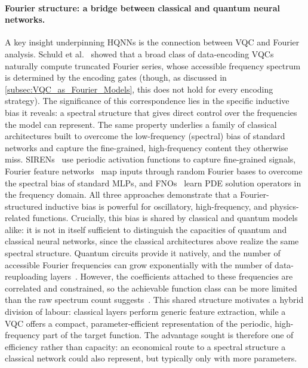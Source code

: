 \documentclass[aps,10pt,groupedaddress,prx,superscriptaddress,twocolumn,balancelastpage, tightenlines]{revtex4-2}
\theoremstyle{plain}  %
\begin{document}
\paragraph{Fourier structure: a bridge between classical and quantum neural networks.} A key insight underpinning HQNNs is the connection between \gls{VQC} and Fourier analysis. Schuld et al.~\cite{Schuld_2021_Effect} showed that a broad class of data-encoding \gls{VQC}s naturally compute truncated Fourier series, whose accessible frequency spectrum is determined by the encoding gates (though, as discussed in \autoref{subsec:VQC_as_Fourier_Models}, this does not hold for every encoding strategy). The significance of this correspondence lies in the specific inductive bias it reveals: a spectral structure that gives direct control over the frequencies the model can represent. The same property underlies a family of classical architectures built to overcome the low-frequency (spectral) bias of standard networks and capture the fine-grained, high-frequency content they otherwise miss. \Glspl{SIREN}~\cite{sitzmann2020siren} use periodic activation functions to capture fine-grained signals, Fourier feature networks~\cite{tancik2020fourier} map inputs through random Fourier bases to overcome the spectral bias of standard \glspl{MLP}, and \glspl{FNO}~\cite{li2020fourier} learn \gls{PDE} solution operators in the frequency domain. All three approaches demonstrate that a Fourier-structured inductive bias is powerful for oscillatory, high-frequency, and physics-related functions. Crucially, this bias is shared by classical and quantum models alike: it is not in itself sufficient to distinguish the capacities of quantum and classical neural networks, since the classical architectures above realize the same spectral structure. Quantum circuits provide it natively, and the number of accessible Fourier frequencies can grow exponentially with the number of data-reuploading layers~\cite{Schuld_2021_Effect,
kordzanganeh2023exponentially, PerezSalinas2020datareuploading}.
However, the coefficients attached to these frequencies are correlated and constrained, so the achievable function class can be more limited than the raw spectrum count suggests~\cite{Schuld_2021_Effect, wiedmann2025fourier}. This shared structure motivates a hybrid division of labour: classical layers perform generic feature extraction, while a \gls{VQC} offers a compact, parameter-efficient representation of the periodic, high-frequency part of the target function. The advantage sought is therefore one of efficiency rather than capacity: an economical route to a spectral structure a classical network could also represent, but typically only with more parameters.
\end{document}
